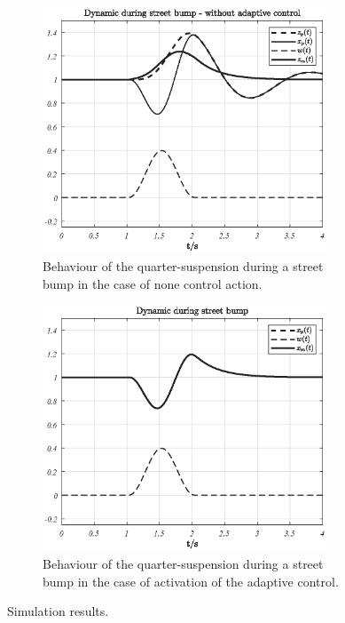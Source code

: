 \documentclass[11pt,a4paper,oneside]{book}
\numberwithin{equation}{section}
\theoremstyle{it}
\theoremstyle{definition}
\begin{document}
\begin{figure}[H]
	\centering
	\begin{subfigure}{.5\textwidth}
		\centering
		\includegraphics[width = 240pt, keepaspectratio]{figures/adaptive_control/track4.eps}
		\captionsetup{width=0.5\textwidth, font=small}		
		\caption{Behaviour of the quarter-suspension during a street bump in the case of none control action.}
		\label{figSim5}
	\end{subfigure}%
	\begin{subfigure}{.5\textwidth}
		\centering
		\includegraphics[width = 240pt, keepaspectratio]{figures/adaptive_control/track1.eps}
		\captionsetup{width=0.5\textwidth, font=small}		
		\caption{Behaviour of the quarter-suspension during a street bump in the case of activation of the adaptive control.}
		\label{figSim6}
	\end{subfigure}
	\caption{Simulation results.}
	\label{}
\end{figure}
\end{document}
